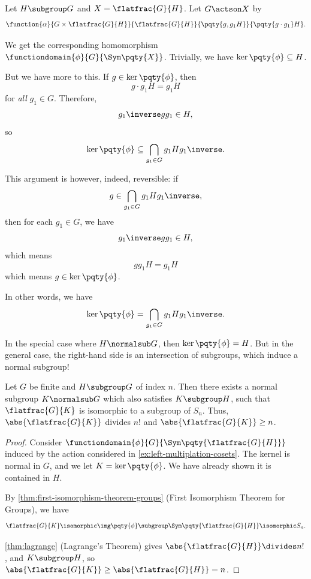 \begin{example}
    \label{ex:left-multiplation-cosets}%
    Let \(H \subgroup G\) and \(X = \flatfrac{G}{H}\). Let \(G \actson X\) by
    \[
        \function{\alpha}{G \times \flatfrac{G}{H}}{\flatfrac{G}{H}}{\pqty{g, g_1 H}}{\pqty{g \cdot g_1} H}.
    \]

    We get the corresponding homomorphism \(\functiondomain{\phi}{G}{\Sym\pqty{X}}\). Trivially, we have \(\ker\pqty{\phi} \subseteq H\).

    But we have more to this. If \(g \in \ker \pqty{\phi}\), then
    \[
        g \cdot g_1 H = g_1 H
    \]
    for \emph{all} \(g_1 \in G\). Therefore,
    \[
        g_1 \inverse g g_1 \in H,
    \]
    so
    \[
        \ker\pqty{\phi} \subseteq \bigcap_{g_1 \in G} g_1 H g_1 \inverse.
    \]

    This argument is however, indeed, reversible: if
    \[
        g \in \bigcap_{g_1 \in G} g_1 H g_1 \inverse,
    \]
    then for each \(g_1 \in G\), we have
    \[
        g_1 \inverse g g_1 \in H,
    \]
    which means
    \[
        g g_1 H = g_1 H
    \]
    which means \(g \in \ker\pqty{\phi}\).

    In other words, we have
    \[
        \ker\pqty{\phi} = \bigcap_{g_1 \in G} g_1 H g_1 \inverse.
    \]

    In the special case where \(H \normalsub G\), then \(\ker\pqty{\phi} = H\). But in the general case, the right-hand side is an intersection of subgroups, which induce a normal subgroup!
\end{example}

\begin{theorem}
    \label{thm:normal-subgroup-contained-in-subgroup}%
    Let \(G\) be finite and \(H \subgroup G\) of index \(n\). Then there exists a normal subgroup \(K \normalsub G\) which also satisfies \(K \subgroup H\), such that \(\flatfrac{G}{K}\) is isomorphic to  a subgroup of \(S_n\). Thus, \(\abs{\flatfrac{G}{K}}\) divides \(n!\) and \(\abs{\flatfrac{G}{K}} \geq n\).
\end{theorem}

\begin{proof}
    Consider \(\functiondomain{\phi}{G}{\Sym\pqty{\flatfrac{G}{H}}}\) induced by the action considered in \autoref{ex:left-multiplation-cosets}. The kernel is normal in \(G\), and we let \(K = \ker \pqty{\phi}\). We have already shown it is contained in \(H\).

    By \autoref{thm:first-isomorphism-theorem-groups} (First Isomorphism Theorem for Groups), we have
    \[
        \flatfrac{G}{K} \isomorphic \img \pqty{\phi} \subgroup \Sym\pqty{\flatfrac{G}{H}} \isomorphic S_n.
    \]

    \autoref{thm:lagrange} (Lagrange's Theorem) gives \(\abs{\flatfrac{G}{H}} \divides n!\), and \(K \subgroup H\), so \(\abs{\flatfrac{G}{K}} \geq \abs{\flatfrac{G}{H}} = n\).
\end{proof}

